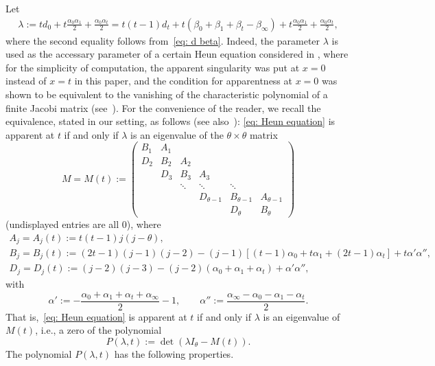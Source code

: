 Let
\begin{gather} \label{eq: lambda}
 \lambda:=td_0+t\frac{\alpha_0\alpha_1}2
 +\frac{\alpha_0\alpha_t}2
 =t(t-1)d_t+t(\beta_0+\beta_1+\beta_t-\beta_\infty)
 +t\frac{\alpha_0\alpha_1}2+\frac{\alpha_0\alpha_t}2,
\end{gather}
where the second equality follows from~\eqref{eq: d beta}. Indeed,
the parameter $\lambda$ is used as the accessary parameter of a
certain Heun equation considered in \cite{Quadrilateral}, where for
the simplicity of computation, the apparent singularity was put at
$x=0$ instead of $x=t$ in this paper, and the condition for
apparentness at $x=0$ was shown to be equivalent to the vanishing of
the characteristic polynomial of a finite Jacobi matrix (see~\cite[Proposition 2.4 and equation~(2.8)]{Quadrilateral}). For the
convenience of the reader, we recall the equivalence, stated in our
setting, as follows (see also~\mbox{\cite[Lemma B.8]{Chen-Lin-Yang}}):
\eqref{eq: Heun equation} is apparent at $t$ if and only if
 $\lambda$ is an eigenvalue of the $\theta\times\theta$ matrix
 \begin{equation} \label{eq: M}
 M=M(t):=\begin{pmatrix}
 B_1 & A_1 & & & & \\
 D_2 & B_2 & A_2 & & & \\
 & D_3 & B_3 & A_3 & & \\
 & & \ddots & \ddots & \ddots & \\
 & & & D_{\theta-1} & B_{\theta-1} & A_{\theta-1} \\
 & & & & D_{\theta} & B_{\theta} \end{pmatrix}
 \end{equation}
 (undisplayed entries are all $0$), where
 \begin{gather*}
 A_j =A_j(t):=t(t-1)j(j-\theta), \\
 B_j =B_j(t):=(2t-1)(j-1)(j-2) -(j-1)[(t-1)\alpha_0+t\alpha_1
 +(2t-1)\alpha_t]
 +t\alpha'\alpha'', \\
 D_j =D_j(t):=(j-2)(j-3)-(j-2)(\alpha_0+\alpha_1+\alpha_t)
 +\alpha'\alpha'',
 \end{gather*}
 with
\[
 \alpha':=-\frac{\alpha_0+\alpha_1+\alpha_t+\alpha_\infty}2-1,
 \qquad \alpha'':=\frac{\alpha_\infty-\alpha_0-\alpha_1-\alpha_t}2.
\]
 That is,~\eqref{eq: Heun equation} is apparent at $t$ if and only if
 $\lambda$ is an eigenvalue of $M(t)$, i.e., a zero of the polynomial
\[
 P(\lambda,t):=\det(\lambda I_\theta-M(t)).
\]
 The polynomial $P(\lambda,t)$ has the following properties.

